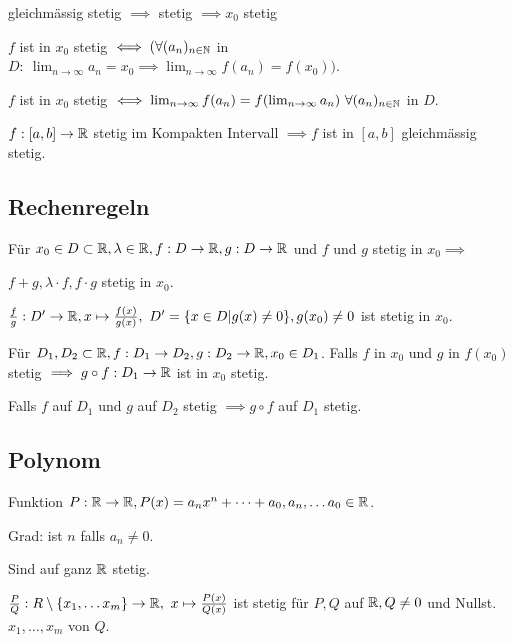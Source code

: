 \begin{compactitem}
    \item gleichmässig stetig $\implies$ stetig $\implies x_0$ stetig
    \item $f$ ist in $x_0$ stetig $\iff (\forall (a_n)_{n \in \mathbb{N}}$ in $D: \ \lim_{n \to \infty} a_n = x_0 \implies \lim_{n \to \infty} f(a_n) = f(x_0))$.
        \begin{compactitem}
            \item $f$ ist in $x_0$ stetig $\iff \lim_{n \to \infty} f(a_n) = f( \lim_{n \to \infty} a_n) \ \forall (a_n)_{n \in \mathbb{N}}$ in $D$.
        \end{compactitem}
    \item $f: [a, b] \to \mathbb{R}$ stetig im Kompakten Intervall $\implies f$ ist in $[a,b]$ gleichmässig stetig.
\end{compactitem}

\subsection{Rechenregeln}
Für $x_0 \in D \subset \mathbb{R}, \lambda \in \mathbb{R}, f: D \to \mathbb{R}, g: D \to \mathbb{R}$ und $f$ und $g$ stetig in $x_0 \implies$
\begin{compactenum}
    \item $f + g, \lambda \cdot f, f \cdot g$ stetig in $x_0$.
    \item $\frac{f}{g}: D' \to \mathbb{R}, x \mapsto \frac{f(x)}{g(x)}, \ D' = \{x \in D | g(x) \neq 0\}, g(x_0) \neq 0$ ist stetig in $x_0$.
\end{compactenum}
Für $D_1, D_2 \subset \mathbb{R}, f: D_1 \to D_2, g: D_2 \to \mathbb{R}, x_0 \in D_1$. Falls $f$ in $x_0$ und $g$ in $f(x_0)$ stetig $\implies g \circ f : D_1 \to \mathbb{R}$ ist in $x_0$ stetig.
\begin{compactitem}
    \item Falls $f$ auf $D_1$ und $g$ auf $D_2$ stetig $\implies g \circ f$ auf $D_1$ stetig.
\end{compactitem}

\subsection{Polynom}
Funktion $P: \mathbb{R} \to \mathbb{R}, P(x)= a_nx^n + \dots + a_0, a_n, \dots a_0 \in \mathbb{R}$.
\begin{compactdesc}
    \item[Grad:] ist $n$ falls $a_n \neq 0$.
\end{compactdesc}
\begin{compactitem}
    \item Sind auf ganz $\mathbb{R}$ stetig.
    \item $\frac{P}{Q}: R \setminus \{x_1, \dots x_m\}  \to \mathbb{R}, \ x \mapsto \frac{P(x)}{Q(x)}$ ist stetig für $P,Q$ auf $\mathbb{R}, Q \neq 0$  und Nullst. $x_1, \dots, x_m$ von $Q$.
\end{compactitem}

